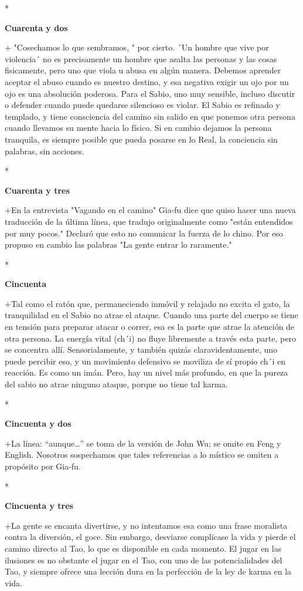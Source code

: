 *

\textbf{Cuarenta y dos}

+ "Cosechamos lo que sembramos, " por cierto. ´Un hombre que vive por
violencia´ no es precisamente un hombre que asalta las personas y las
cosas fisicamente, pero uno que viola u abusa en algún manera. Debemos
aprender aceptar el abuso cuando es nuestro destino, y esa negativa
exigir un ojo por un ojo es una absolución poderosa. Para el Sabio, uno
muy sensible, incluso discutir o defender cuando puede quedarse
silencioso es violar. El Sabio es refinado y templado, y tiene
consciencia del camino sin salido en que ponemos otra persona cuando
llevamos su mente hacia lo físico. Si en cambio dejamos la persona
tranquila, es siempre posible que pueda posarse en lo Real, la
conciencia sin palabras, sin acciones.

*

\textbf{Cuarenta y tres}

+En la entrevista "Vagando en el camino" Gia-fu dice que quiso hacer una
nueva traducción de la última línea, que tradujo originalmente como
"están entendidos por muy pocos." Declaró que esto no comunicar la
fuerza de lo chino. Por eso propuso en cambio las palabras "La gente
entrar lo raramente."

*

\textbf{Cincuenta}

+Tal como el ratón que, permaneciendo inmóvil y relajado no excita el
gato, la tranquilidad en el Sabio no atrae el ataque. Cuando una parte
del cuerpo se tiene en tensión para preparar atacar o correr, esa es la
parte que atrae la atención de otra persona. La energía vital (ch´i) no
fluye libremente a través esta parte, pero se concentra allí.
Sensorialamente, y también quizás claravidentamente, uno puede percibir
eso, y un movimiento defensivo se moviliza de sí propio ch´i en
reacción. Es como un imán. Pero, hay un nivel más profundo, en que la
pureza del sabio no atrae ninguno ataque, porque no tiene tal karma.

*

\textbf{Cincuenta y dos}

+La línea: ``aunque\ldots'' se toma de la versión de John Wu; se omite
en Feng y English. Nosotros sospechamos que tales referencias a lo
místico se omiten a propósito por Gia-fu.

*

\textbf{Cincuenta y tres}

+La gente se encanta divertirse, y no intentamos esa como una frase
moralista contra la diversión, el goce. Sin embargo, desviarse
complicase la vida y pierde el camino directo al Tao, lo que es
disponible en cada momento. El jugar en las ilusiones es no obstante el
jugar en el Tao, con uno de las potencialidades del Tao, y siempre
ofrece una lección dura en la perfección de la ley de karma en la vida.

